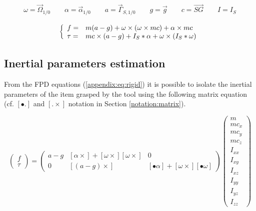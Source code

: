 \documentclass[\main/main.tex]{subfiles}
\begin{document}
\begin{align*}
 \omega = \overrightarrow{\Omega}_{1/0} \qquad \alpha = \overrightarrow{\alpha}_{1/0} \qquad a = \overrightarrow{\Gamma}_{S, 1/0} \qquad g = \overrightarrow{g} \qquad c  = \overrightarrow{SG} \qquad I = I_{S}
\end{align*}

\begin{equation}
 \label{appendix:eq:rigid}
 \left \{
 \begin{array}{l l}
  f =    & m (a - g) + \omega \times (\omega \times m c) + \alpha \times m c \\
  \tau = & m c \times (a - g)
  + I_{S} \ast \alpha + \omega \times (I_{S} \ast \omega)
 \end{array}
 \right.
\end{equation}

\subsection{Inertial parameters estimation}
\label{appendix:rigid:inertia_estimation}

From the \ac{FPD} equations (\ref{appendix:eq:rigid}) it is possible to isolate the inertial parameters of the item grasped by the tool using the following matrix equation (cf. $\left[ \bullet . \right]$ and $\left[. \times \right]$ notation in Section \ref{notation:matrix}).

\begin{equation}
 \begin{pmatrix}
  f    \\
  \tau
 \end{pmatrix}
 =
 \begin{pmatrix}
  a - g & \left[ \alpha \times \right] +  \left[ \omega \times \right] \left[ \omega \times \right] & 0                                                                                                             \\
  0     & \left[ (a - g) \times \right]                                                                                & \left[ \bullet \alpha \right] + \left[ \omega \times \right] \left[ \bullet \omega \right]
 \end{pmatrix}
 \begin{pmatrix}
  m      \\
  m c_x  \\
  m c_y  \\
  m c_z  \\
  I_{xx} \\
  I_{xy} \\
  I_{xz} \\
  I_{yy} \\
  I_{yz} \\
  I_{zz}
 \end{pmatrix}
\end{equation}
\end{document}
